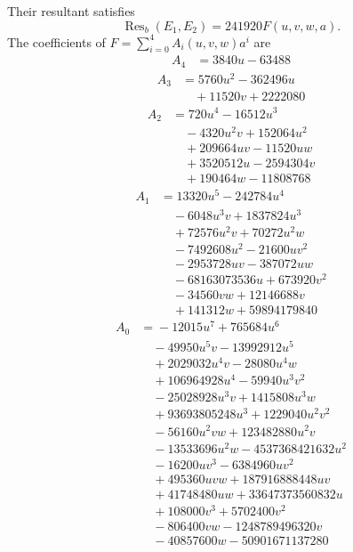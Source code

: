 \documentclass[11pt,reqno,letterpaper]{amsart}
\newcommand{\Res}{\operatorname{Res}}
\theoremstyle{definition}
\numberwithin{equation}{section}
\begin{document}
Their resultant satisfies
\[
 \Res_b(E_1,E_2)=241920F(u,v,w,a).
\]
The coefficients of $F=\sum_{i=0}^4A_i(u,v,w)a^i$ are
\begin{align*}
A_4&={}3840 u - 63488
\end{align*}
\begin{align*}
A_3&={}5760 u^{2} - 362496 u\\
&\quad{} + 11520 v + 2222080
\end{align*}
\begin{align*}
A_2&={}720 u^{4} - 16512 u^{3}\\
&\quad{} - 4320 u^{2} v + 152064 u^{2}\\
&\quad{} + 209664 u v - 11520 u w\\
&\quad{} + 3520512 u - 2594304 v\\
&\quad{} + 190464 w - 11808768
\end{align*}
\begin{align*}
A_1&={}13320 u^{5} - 242784 u^{4}\\
&\quad{} - 6048 u^{3} v + 1837824 u^{3}\\
&\quad{} + 72576 u^{2} v + 70272 u^{2} w\\
&\quad{} - 7492608 u^{2} - 21600 u v^{2}\\
&\quad{} - 2953728 u v - 387072 u w\\
&\quad{} - 68163073536 u + 673920 v^{2}\\
&\quad{} - 34560 v w + 12146688 v\\
&\quad{} + 141312 w + 59894179840
\end{align*}
\begin{align*}
A_0&={}-12015 u^{7} + 765684 u^{6}\\
&\quad{} - 49950 u^{5} v - 13992912 u^{5}\\
&\quad{} + 2029032 u^{4} v - 28080 u^{4} w\\
&\quad{} + 106964928 u^{4} - 59940 u^{3} v^{2}\\
&\quad{} - 25028928 u^{3} v + 1415808 u^{3} w\\
&\quad{} + 93693805248 u^{3} + 1229040 u^{2} v^{2}\\
&\quad{} - 56160 u^{2} v w + 123482880 u^{2} v\\
&\quad{} - 13533696 u^{2} w - 4537368421632 u^{2}\\
&\quad{} - 16200 u v^{3} - 6384960 u v^{2}\\
&\quad{} + 495360 u v w + 187916888448 u v\\
&\quad{} + 41748480 u w + 33647373560832 u\\
&\quad{} + 108000 v^{3} + 5702400 v^{2}\\
&\quad{} - 806400 v w - 1248789496320 v\\
&\quad{} - 40857600 w - 50901671137280
\end{align*}
\end{document}
